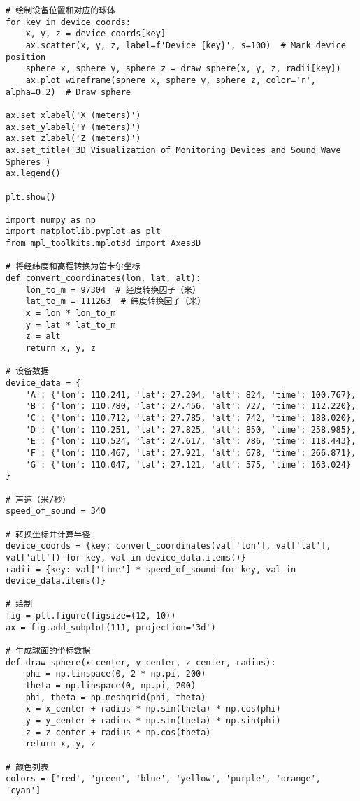 \documentclass[withoutpreface,bwprint,12pt,a4paper]{cumcmthesis}
\begin{document}
\begin{appendices}
\begin{lstlisting}
# 绘制设备位置和对应的球体
for key in device_coords:
    x, y, z = device_coords[key]
    ax.scatter(x, y, z, label=f'Device {key}', s=100)  # Mark device position
    sphere_x, sphere_y, sphere_z = draw_sphere(x, y, z, radii[key])
    ax.plot_wireframe(sphere_x, sphere_y, sphere_z, color='r', alpha=0.2)  # Draw sphere

ax.set_xlabel('X (meters)')
ax.set_ylabel('Y (meters)')
ax.set_zlabel('Z (meters)')
ax.set_title('3D Visualization of Monitoring Devices and Sound Wave Spheres')
ax.legend()

plt.show()

import numpy as np
import matplotlib.pyplot as plt
from mpl_toolkits.mplot3d import Axes3D

# 将经纬度和高程转换为笛卡尔坐标
def convert_coordinates(lon, lat, alt):
    lon_to_m = 97304  # 经度转换因子（米）
    lat_to_m = 111263  # 纬度转换因子（米）
    x = lon * lon_to_m
    y = lat * lat_to_m
    z = alt
    return x, y, z

# 设备数据
device_data = {
    'A': {'lon': 110.241, 'lat': 27.204, 'alt': 824, 'time': 100.767},
    'B': {'lon': 110.780, 'lat': 27.456, 'alt': 727, 'time': 112.220},
    'C': {'lon': 110.712, 'lat': 27.785, 'alt': 742, 'time': 188.020},
    'D': {'lon': 110.251, 'lat': 27.825, 'alt': 850, 'time': 258.985},
    'E': {'lon': 110.524, 'lat': 27.617, 'alt': 786, 'time': 118.443},
    'F': {'lon': 110.467, 'lat': 27.921, 'alt': 678, 'time': 266.871},
    'G': {'lon': 110.047, 'lat': 27.121, 'alt': 575, 'time': 163.024}
}

# 声速（米/秒）
speed_of_sound = 340

# 转换坐标并计算半径
device_coords = {key: convert_coordinates(val['lon'], val['lat'], val['alt']) for key, val in device_data.items()}
radii = {key: val['time'] * speed_of_sound for key, val in device_data.items()}

# 绘制
fig = plt.figure(figsize=(12, 10))
ax = fig.add_subplot(111, projection='3d')

# 生成球面的坐标数据
def draw_sphere(x_center, y_center, z_center, radius):
    phi = np.linspace(0, 2 * np.pi, 200)
    theta = np.linspace(0, np.pi, 200)
    phi, theta = np.meshgrid(phi, theta)
    x = x_center + radius * np.sin(theta) * np.cos(phi)
    y = y_center + radius * np.sin(theta) * np.sin(phi)
    z = z_center + radius * np.cos(theta)
    return x, y, z

# 颜色列表
colors = ['red', 'green', 'blue', 'yellow', 'purple', 'orange', 'cyan']


\end{lstlisting}
\end{appendices}
\end{document}
